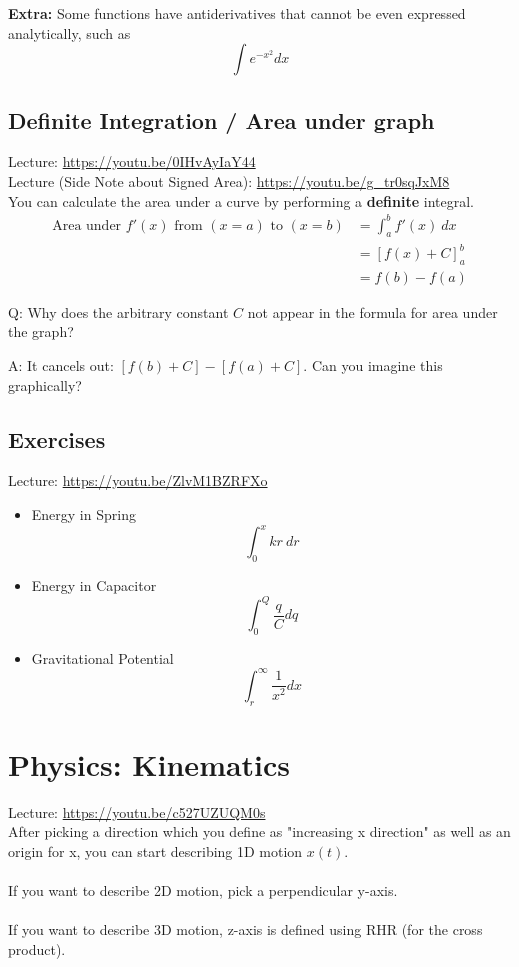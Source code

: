 \documentclass{article}
\begin{document}
\textbf{Extra:} Some functions have antiderivatives that cannot be even expressed analytically, such as $$\int e^{-x^2} dx$$

\subsection{Definite Integration / Area under graph}
Lecture: \url{https://youtu.be/0IHvAyIaY44}\\[10pt]
Lecture (Side Note about Signed Area): \url{https://youtu.be/g_tr0sqJxM8}\\[10pt]
You can calculate the area under a curve by performing a \textbf{definite} integral.
\begin{align}
    \text{Area under }f'(x)\text{ from }(x=a)\text{ to }(x=b) &= \int_a^b f'(x)\ dx  \\
    &= \left[f(x) + C\right]^b_a \\
    &= f(b) - f(a)
\end{align}

Q: Why does the arbitrary constant $C$ not appear in the formula for area under the graph? 

A: It cancels out: $[f(b) + C] - [f(a) + C]$. Can you imagine this graphically? 

\subsection{Exercises}
Lecture: \url{https://youtu.be/ZlvM1BZRFXo}\\[10pt]
\begin{itemize}
    \item Energy in Spring
        $$\int_0^x kr\ dr$$
    \item Energy in Capacitor
        $$\int_0^Q \frac{q}{C} dq$$
    \item Gravitational Potential
        $$\int_{r}^{\infty} \frac{1}{x^2} dx$$
\end{itemize}

\section{Physics: Kinematics}
Lecture: \url{https://youtu.be/c527UZUQM0s} \\[10pt]
After picking a direction which you define as "increasing x direction" as well as an origin for x, you can start describing 1D motion $x(t)$.\\
\\
If you want to describe 2D motion, pick a perpendicular y-axis. \\
\\
If you want to describe 3D motion, z-axis is defined using RHR (for the cross product).
\end{document}
